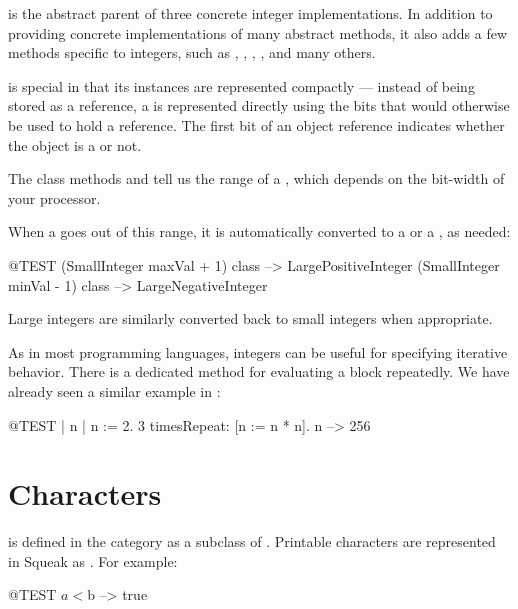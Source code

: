\documentclass[a4paper,10pt,twoside]{book}
\begin{document}
 is the abstract parent of three concrete integer implementations.
In addition to providing concrete implementations of many abstract  methods, it also adds a few methods specific to integers, such as , , , , and many others.

 is special in that its instances are represented compactly --- instead of being stored as a reference, a  is represented directly using the bits that would otherwise be used to hold a reference.
The first bit of an object reference indicates whether the object is a  or not.

The class methods  and  tell us the range of a , which depends on the bit-width of your processor.

When a  goes out of this range, it is automatically converted to a  or a , as needed:

\begin{code}{@TEST}
(SmallInteger maxVal + 1) class --> LargePositiveInteger
(SmallInteger minVal - 1) class  --> LargeNegativeInteger
\end{code}

Large integers are similarly converted back to small integers when appropriate.

As in most programming languages, integers can be useful for specifying iterative behavior.
There is a dedicated method  for evaluating a block repeatedly.
We have already seen a similar example in :
\begin{code}{@TEST | n |}
n := 2.
3 timesRepeat: [n := n * n].
n --> 256
\end{code}

\section{Characters}

 is defined in the  category as a subclass of .
Printable characters are represented in Squeak as .
For example:

\begin{code}{@TEST}
$a < $b --> true
\end{code}
\end{document}
